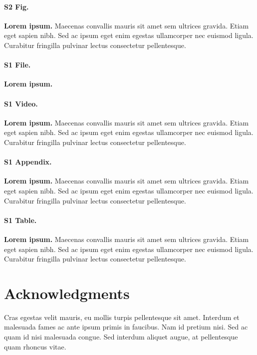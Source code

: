 \documentclass[
  10pt,
  letterpaper,
]{article}
\begin{document}
\paragraph*{S2 Fig.}
\label{s2-fig}
{\textbf{Lorem ipsum.}} Maecenas convallis mauris sit amet sem ultrices
gravida. Etiam eget sapien nibh. Sed ac ipsum eget enim egestas
ullamcorper nec euismod ligula. Curabitur fringilla pulvinar lectus
consectetur pellentesque.

\paragraph*{S1 File.}
\label{s1-file}
{\textbf{Lorem ipsum.}}

\paragraph*{S1 Video.}
\label{s1-video}
{\textbf{Lorem ipsum.}} Maecenas convallis mauris sit amet sem ultrices
gravida. Etiam eget sapien nibh. Sed ac ipsum eget enim egestas
ullamcorper nec euismod ligula. Curabitur fringilla pulvinar lectus
consectetur pellentesque.

\paragraph*{S1 Appendix.}
\label{s1-appendix}
{\textbf{Lorem ipsum.}} Maecenas convallis mauris sit amet sem ultrices
gravida. Etiam eget sapien nibh. Sed ac ipsum eget enim egestas
ullamcorper nec euismod ligula. Curabitur fringilla pulvinar lectus
consectetur pellentesque.

\paragraph*{S1 Table.}
\label{s1-table}
{\textbf{Lorem ipsum.}} Maecenas convallis mauris sit amet sem ultrices
gravida. Etiam eget sapien nibh. Sed ac ipsum eget enim egestas
ullamcorper nec euismod ligula. Curabitur fringilla pulvinar lectus
consectetur pellentesque.

\section{Acknowledgments}\label{acknowledgments}

Cras egestas velit mauris, eu mollis turpis pellentesque sit amet.
Interdum et malesuada fames ac ante ipsum primis in faucibus. Nam id
pretium nisi. Sed ac quam id nisi malesuada congue. Sed interdum aliquet
augue, at pellentesque quam rhoncus vitae.


\nolinenumbers
  
\end{document}
